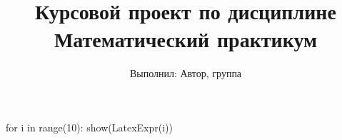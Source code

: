 \documentclass[14pt, a4paper]{extarticle}
\title{Курсовой проект по дисциплине Математический практикум}
\author{Выполнил: Автор, группа}
\begin{document}

%



\setcounter{page}{2} %

%
\begin{sagesilent}
for i in range(10):
	show(LatexExpr(i))
\end{sagesilent}
% 
% 




\end{document}
